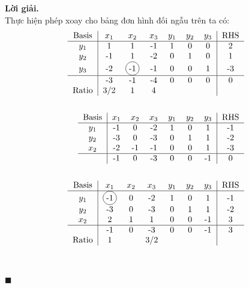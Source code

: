\documentclass[12pt]{article}
\newcommand*\circled[1]{\tikz[baseline=(char.base)]{%
            \node[shape=circle,draw,inner sep=2pt] (char) {#1};}}
\newenvironment{solution}{%
     \setlength\parindent{0pt}\par\medskip\textbf{Lời giải.}\quad}{%
     \hfill\tiny$\blacksquare$\par\medskip}
\begin{document}
\begin{solution}
        \\
        Thực hiện phép xoay cho bảng đơn hình đối ngẫu trên ta có:
        \begin{align*}
            \begin{tabular}{c|cccccc|c}
                Basis &$x_1$ & $x_2$ & $x_3$ & $y_1$ & $y_2$ & $y_3$ & RHS \\ \hline
                $y_1$ & 1 & 1 & -1 & 1 & 0 & 0 & 2 \\
                $y_2$ & -1 & 1 & -2 & 0 & 1 & 0 & 1 \\
                $y_3$ & -2 & \circled{-1} & -1 & 0 & 0 & 1 & -3 \\ \hline
                & -3 & -1 & -4 & 0 & 0 & 0 & 0 \\
                Ratio & 3/2 & 1 & 4 &  &  &  & 
            \end{tabular}
            \\
            \\
            \begin{tabular}{c|cccccc|c}
                Basis &$x_1$ & $x_2$ & $x_3$ & $y_1$ & $y_2$ & $y_3$ & RHS \\ \hline
                $y_1$ &-1 & 0 & -2 & 1 & 0 & 1 & -1 \\
                $y_2$ &-3 & 0 & -3 & 0 & 1 & 1 & -2 \\
                $x_2$ &-2 & -1 & -1 & 0 & 0 & 1 & -3 \\ \hline
                &-1 & 0 & -3 & 0 & 0 & -1 & 0 \\
            \end{tabular}
            \\
            \\
            \begin{tabular}{c|cccccc|c}
                Basis &$x_1$ & $x_2$ & $x_3$ & $y_1$ & $y_2$ & $y_3$ & RHS \\ \hline
                $y_1$ & \circled{-1} & 0 & -2 & 1 & 0 & 1 & -1 \\
                $y_2$ & -3 & 0 & -3 & 0 & 1 & 1 & -2 \\
                $x_2$ & 2 & 1 & 1 & 0 & 0 & -1 & 3 \\ \hline
                & -1 & 0 & -3 & 0 & 0 & -1 & 3 \\
                Ratio & 1 & & 3/2 & & & &
            \end{tabular}
            \\
            \\
            \begin{tabular}{c|cccccc|c}

\end{tabular}
\end{align*}
\end{solution}
\end{document}
